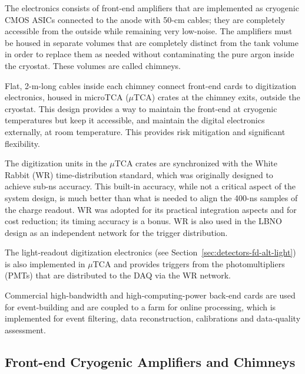 The electronics consists of front-end amplifiers that are implemented as cryogenic CMOS ASICs
connected to the anode with 50-cm cables; they are completely
accessible from the outside while remaining very low-noise. The
amplifiers must be housed in separate volumes that
are completely distinct from the tank volume
in order to replace them as needed without
contaminating the pure argon inside the cryostat. These volumes are called chimneys.

Flat, 2-m-long cables inside each chimney connect front-end cards
to digitization electronics, housed in microTCA ($\mu$TCA) crates at the chimney exits, outside the cryostat.
This design provides a way to maintain the front-end at cryogenic temperatures but keep
it accessible, and maintain the digital electronics externally, at room temperature.
 This provides risk mitigation and significant flexibility. 

The digitization units in the $\mu$TCA
crates are synchronized with the White Rabbit (WR) time-distribution
standard\cite{WR-standard}, which was originally designed to achieve
sub-ns accuracy.
%
This built-in accuracy, while not a critical aspect of the system
design, is much better than what is needed to align the 400-ns samples
of the charge readout.  WR was adopted for its practical
integration aspects and for cost reduction; its timing accuracy is a
bonus.   WR is also used in the LBNO design as an independent
network for the trigger distribution. 

The light-readout digitization
electronics (see Section~\ref{sec:detectors-fd-alt-light}) is also
implemented in $\mu$TCA and provides triggers from the
photomultipliers (PMTs) that are distributed to the DAQ via the WR
network. 

Commercial high-bandwidth and high-computing-power back-end
cards are used for event-building and are coupled to a farm for online
processing, which is implemented for event filtering, data
reconstruction, calibrations and data-quality assessment. %



\subsection{Front-end Cryogenic Amplifiers and Chimneys}

